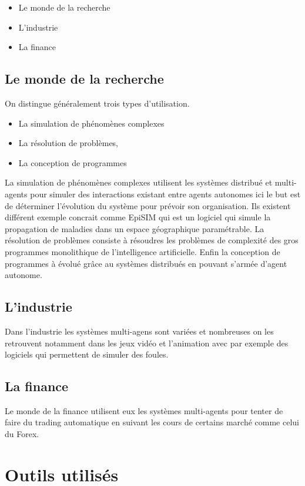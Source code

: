 \documentclass[11pt]{article} %
\begin{document}
\begin{itemize}
\item Le monde de la recherche
\item L'industrie
\item La finance
\end{itemize}

\subsection{Le monde de la recherche}
On distingue généralement trois types d'utilisation.

\begin{itemize}
\item La simulation de phénomènes complexes
\item La résolution de problèmes,
\item La conception de programmes
\end{itemize}
La simulation de phénomènes complexes utilisent les systèmes distribué et multi-agents pour simuler des interactions existant entre agents autonomes ici le but est de déterminer l'évolution du système pour prévoir son organisation. Ils existent différent exemple concrait comme EpiSIM qui est un logiciel qui simule la propagation de maladies dans un espace géographique paramétrable.
La résolution de problèmes consiste à résoudres les problèmes de complexité des gros programmes monolithique de l'intelligence artificielle. Enfin la conception de programmes à évolué grâce au systèmes distribués en pouvant s'armée d'agent autonome.

\subsection{L'industrie}
Dans l'industrie les systèmes multi-agens sont variées et nombreuses on les retrouvent notamment dans les jeux vidéo et l'animation avec par exemple des logiciels qui permettent de simuler des foules.

\subsection{La finance}
Le monde de la finance utilisent eux les systèmes multi-agents pour tenter de faire du trading automatique en suivant les cours de certains marché comme celui du Forex.

\section{Outils utilisés}
\end{document}

